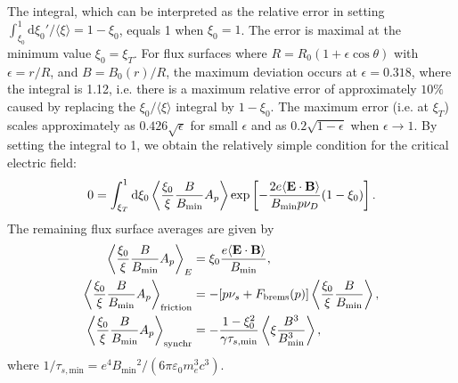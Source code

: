 \documentclass[11pt,a4paper]{article}
\newcommand{\rd}{\ensuremath{\mathrm{d}}}
\newcommand{\sub}[1]{\ensuremath{_{\text{#1}}}}
\renewcommand{\b}[1]{\ensuremath{ {\bf #1 } }}
\begin{document}
The integral, which can be interpreted as the relative error in setting $\int_{\xi_0}^1 \rd \xi_0'/\langle \xi \rangle = 1-\xi_0$, equals 1 when $\xi_0=1$. The error is maximal at the minimum value $\xi_0 = \xi_T$. For flux surfaces where $R = R_0 (1+\epsilon \cos\theta)$ with $\epsilon=r/R$, and $B = B_0(r)/R$, the maximum deviation occurs at $\epsilon=0.318$, where the integral is 1.12, i.e. there is a maximum relative error of approximately $10\%$ caused by replacing the $\xi_0 / \langle \xi \rangle$ integral by $1-\xi_0$. The maximum error (i.e. at $\xi_T$) scales approximately as $0.426\sqrt{\epsilon}$ for small $\epsilon$ and as $0.2\sqrt{1-\epsilon}$ when $\epsilon \to 1$. By setting the integral to 1, we obtain the relatively simple condition for the critical electric field:
\begin{align}
0 = \int_{\xi_T}^1\rd \xi_0 \left\langle \frac{\xi_0}{\xi}\frac{B}{B\sub{min}} A_p   \right\rangle \exp \left[-\frac{2e\langle \b{E}\cdot\b{B}\rangle}{B\sub{min} p \nu_D}(1-\xi_0) \right] .
\end{align}
The remaining flux surface averages are given by
\begin{align}
\left\langle \frac{\xi_0}{\xi}\frac{B}{B\sub{min}} A_p   \right\rangle_E &= \xi_0\frac{e \langle\b{E}\cdot\b{B}\rangle}{B\sub{min}}, \nonumber \\
\left\langle \frac{\xi_0}{\xi}\frac{B}{B\sub{min}} A_p   \right\rangle\sub{friction} &= -[p\nu_s + F\sub{brems}(p)]\left\langle \frac{\xi_0}{\xi}\frac{B}{B\sub{min}} \right\rangle, \nonumber \\
\left\langle \frac{\xi_0}{\xi}\frac{B}{B\sub{min}} A_p   \right\rangle\sub{synchr} &= -\frac{1-\xi_0^2}{\gamma \tau_{s,\text{min}}}\left\langle \xi\frac{B^3}{B\sub{min}^3}  \right\rangle,
\end{align}
where $1/\tau_{s,\text{min}} = e^4 B\sub{min}^2/(6\pi\varepsilon_0 m_e^3 c^3)$.


%
\end{document}

